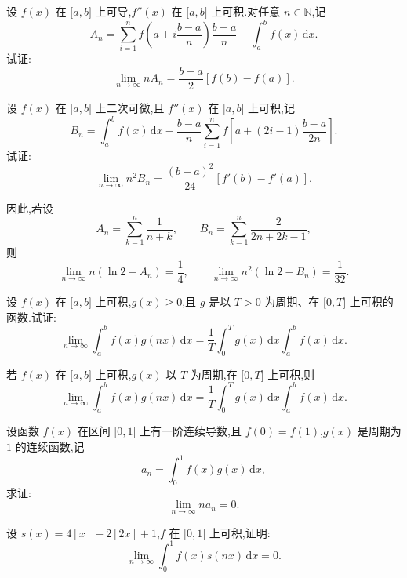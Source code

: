 \documentclass[../数学分析培优讲义.tex]{subfiles}
\begin{document}
\begin{example}
设 $f(x)$ 在 $\lbrack a,b\rbrack$ 上可导,$f''(x)$ 在 $\lbrack a,b\rbrack$ 上可积.对任意 $n\in\mathbb{N}$,记
\[
    A_n=\sum\limits_{i=1}^n f\left(a+i\dfrac{b-a}{n}\right)\dfrac{b-a}{n}
    -\int_a^b f(x)\,\mathrm{d}x.
\]
试证:
\[
    \lim\limits_{n\to\infty}nA_n
    =\dfrac{b-a}{2}[f(b)-f(a)].
\]
\end{example}
\exampleblank

\begin{example}[\markstar]
设 $f(x)$ 在 $\lbrack a,b\rbrack$ 上二次可微,且 $f''(x)$ 在 $\lbrack a,b\rbrack$ 上可积,记
\[
    B_n=\int_a^b f(x)\,\mathrm{d}x
    -\dfrac{b-a}{n}\sum\limits_{i=1}^n
    f\left[a+(2i-1)\dfrac{b-a}{2n}\right].
\]
试证:
\[
    \lim\limits_{n\to\infty}n^2B_n
    =\dfrac{(b-a)^2}{24}[f'(b)-f'(a)].
\]
\end{example}
\exampleblank

\begin{remark}
因此,若设
\[
    A_n=\sum\limits_{k=1}^n\dfrac{1}{n+k},
    \qquad
    B_n=\sum\limits_{k=1}^n\dfrac{2}{2n+2k-1},
\]
则
\[
    \lim\limits_{n\to\infty}n(\ln2-A_n)=\dfrac{1}{4},
    \qquad
    \lim\limits_{n\to\infty}n^2(\ln2-B_n)=\dfrac{1}{32}.
\]
\end{remark}

\begin{example}[\markstar]
设 $f(x)$ 在 $\lbrack a,b\rbrack$ 上可积,$g(x)\geq0$,且 $g$ 是以 $T>0$ 为周期、在 $\lbrack 0,T\rbrack$ 上可积的函数.试证:
\[
    \lim\limits_{n\to\infty}\int_a^b f(x)g(nx)\,\mathrm{d}x
    =\dfrac{1}{T}\int_0^Tg(x)\,\mathrm{d}x\int_a^b f(x)\,\mathrm{d}x.
\]
\end{example}
\exampleblank

\begin{example}
若 $f(x)$ 在 $\lbrack a,b\rbrack$ 上可积,$g(x)$ 以 $T$ 为周期,在 $\lbrack 0,T\rbrack$ 上可积,则
\[
    \lim\limits_{n\to\infty}\int_a^b f(x)g(nx)\,\mathrm{d}x
    =\dfrac{1}{T}\int_0^Tg(x)\,\mathrm{d}x\int_a^b f(x)\,\mathrm{d}x.
\]
\end{example}
\exampleblank

\begin{example}
设函数 $f(x)$ 在区间 $\lbrack 0,1\rbrack$ 上有一阶连续导数,且 $f(0)=f(1)$,$g(x)$ 是周期为 $1$ 的连续函数,记
\[
    a_n=\int_0^1 f(x)g(x)\,\mathrm{d}x,
\]
求证:
\[
    \lim\limits_{n\to\infty}na_n=0.
\]
\end{example}
\exampleblank

\begin{example}
设 $s(x)=4[x]-2[2x]+1$,$f$ 在 $\lbrack 0,1\rbrack$ 上可积,证明:
\[
    \lim\limits_{n\to\infty}\int_0^1 f(x)s(nx)\,\mathrm{d}x=0.
\]
\end{example}
\exampleblank
\end{document}
